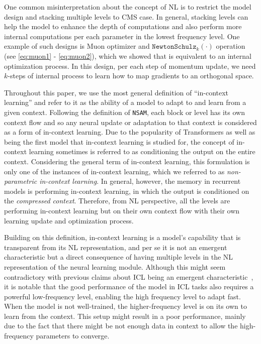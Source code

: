 \documentclass{article}
\newcommand{\citep}{\parencite}
\newcommand{\headred}[1]{\vspace{1.7mm}\noindent{{\textcolor{c5}{\bf #1.}}}}
\newcommand{\nsam}{\texttt{NSAM}}
\begin{document}
{\headred{More Computations per Neuron} One common misinterpretation about the concept of NL is to restrict the model design and stacking multiple levels to CMS case. In general, stacking levels can help the model to enhance the depth of computations and also perform more internal computations per each parameter in the lowest frequency level. One example of such designs is Muon optimizer and $\texttt{NewtonSchulz}_k(\cdot)$ operation (see \autoref{eq:muon1} - \ref{eq:muon2}), which we showed that is equivalent to an internal optimization process. In this design, per each step of momentum update, we need $k$-steps of internal process to learn how to map gradients to an orthogonal space. 

\headred{In-Context Learning}
Throughout this paper, we use the most general definition of ``in-context learning'' and refer to it as the ability of a model to adapt to and learn from a given context. Following the definition of \nsam, each block or level has its own context flow and so any neural update or adaptation to that context is considered as a form of in-context learning. Due to the popularity of Transformers as well as being the first model that in-context learning is studied for, the concept of in-context learning sometimes is referred to as conditioning the output on the entire context. Considering the general term of in-context learning, this formulation is only one of the instances of in-context learning, which we referred to as \emph{non-parametric in-context learning}. In general, however, the memory in recurrent models is performing in-context learning, in which the output is conditioned on the \emph{compressed context}. Therefore, from NL perspective, all the levels are performing in-context learning but on their own context flow with their own learning update and optimization process. 

Building on this definition, in-context learning is a model's capability  that is transparent from its NL representation, and per se it is not an emergent characteristic but a direct consequence of having multiple levels in the NL representation of the neural learning module. Although this might seem contradictory with previous claims about ICL being an emergent characteristic~\citep{brown2020language, singh2023transient}, it is notable that the good performance of the model in ICL tasks also requires a powerful low-frequency level, enabling the high frequency level to adapt fast. When the model is not well-trained, the higher-frequency level is on its own to learn from the context. This setup might result in a poor performance, mainly due to the fact that there might be not enough data in context to allow the high-frequency parameters to converge.  

}
\end{document}
